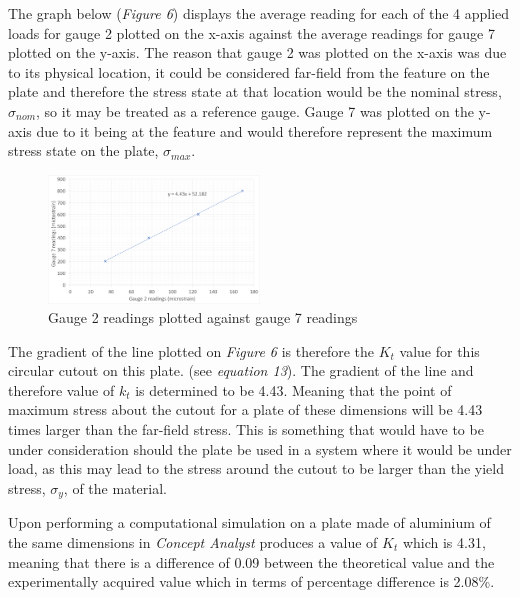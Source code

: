 \documentclass[11pt,twocolumn]{article} %
\begin{document}
The graph below (\textit{Figure 6}) displays the average reading for each of the 4 applied loads for gauge 2 plotted on the x-axis against the average readings for gauge 7 plotted on the y-axis. The reason that gauge 2 was plotted on the x-axis was due to its physical location, it could be considered far-field from the feature on the plate and therefore the stress state at that location would be the nominal stress, $\sigma_{nom}$, so it may be treated as a reference gauge. Gauge 7 was plotted on the y-axis due to it being at the feature and would therefore represent the maximum stress state on the plate, $\sigma_{max}$. 
\begin{figure}[!ht]
	\centering
		\includegraphics[width=0.5\textwidth]{G2G7.png}
	\caption{Gauge 2 readings plotted against gauge 7 readings}
\end{figure} 
The gradient of the line plotted on \textit{Figure 6} is therefore the $K_{t}$ value for this circular cutout on this plate. (see \textit{equation 13}). The gradient of the line and therefore value of $k_{t}$ is determined to be 4.43. Meaning that the point of maximum stress about the cutout for a plate of these dimensions  will be 4.43 times larger than the far-field stress. This is something that would have to be under consideration should the plate be used in a system where it would be under load, as this may lead to the stress around the cutout to be larger than the yield stress, $\sigma_{y}$, of the material. 
\par 
Upon performing a computational simulation on a plate made of aluminium of the same dimensions in \textit{Concept Analyst} produces a value of $K_{t}$ which is 4.31, meaning that there is a difference of 0.09 between the theoretical value and the experimentally acquired value which in terms of percentage difference is 2.08\%.
\par  
\end{document}
